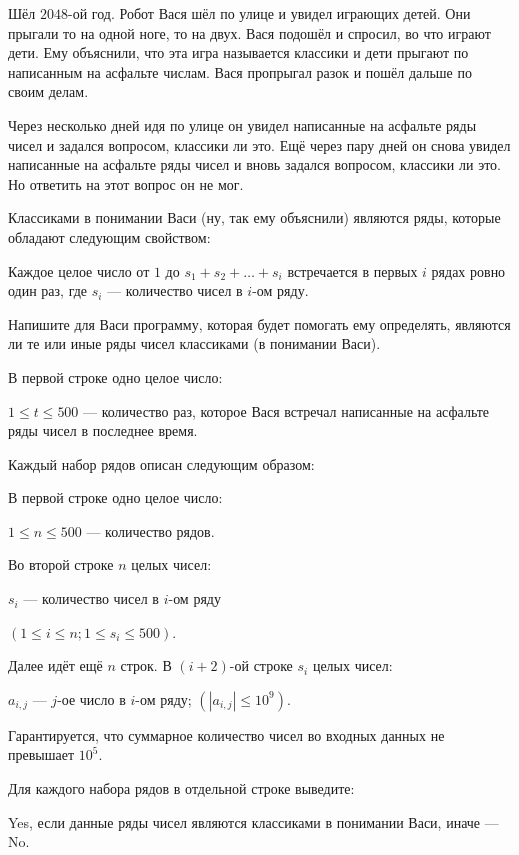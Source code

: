 
Шёл $2048$-ой год. Робот Вася шёл по улице и увидел играющих детей. 
Они прыгали то на одной ноге, то на двух. Вася подошёл и спросил, во что играют дети. 
Ему объяснили, что эта игра называется классики и дети прыгают по написанным на асфальте числам. 
Вася пропрыгал разок и пошёл дальше по своим делам.

Через несколько дней идя по улице он увидел написанные на асфальте ряды чисел и задался вопросом, 
классики ли это. Ещё через пару дней он снова увидел написанные на асфальте ряды чисел и вновь 
задался вопросом, классики ли это. 
Но ответить на этот вопрос он не мог.

Классиками в понимании Васи (ну, так ему объяснили) являются ряды, которые обладают следующим свойством:

Каждое целое число от $1$ до $s_{1} + s_{2} + \ldots + s_{i}$ встречается в первых $i$ рядах ровно один раз, где $s_{i}$ — количество чисел 
в $i$-ом ряду.

Напишите для Васи программу, которая будет помогать ему определять, являются ли те или иные ряды чисел классиками (в понимании Васи).


В первой строке одно целое число:

$1 \leq t \leq 500$ — количество раз, которое Вася встречал написанные на асфальте ряды чисел в последнее время.

Каждый набор рядов описан следующим образом:

В первой строке одно целое число:

$1 \leq n \leq 500$ — количество рядов.

Во второй строке $n$ целых чисел:

$s_{i}$ — количество чисел в $i$-ом ряду

$(1 \leq i \leq n; 1 \leq s_{i} \leq 500)$.

Далее идёт ещё $n$ строк. В $(i+2)$-ой строке $s_{i}$ целых чисел:

$a_{i,j}$ — $j$-ое число в $i$-ом ряду; $(|a_{i,j}| \leq 10^9)$.

Гарантируется, что суммарное количество чисел во входных данных не превышает $10^5$.

\outputfmtSection

Для каждого набора рядов в отдельной строке выведите:

Yes, если данные ряды чисел являются классиками в понимании Васи, иначе — No.

